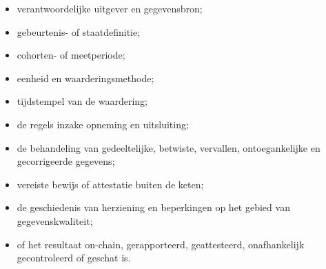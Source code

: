 \documentclass[11pt]{article}
\begin{document}
\begin{itemize}[leftmargin=*]
\item verantwoordelijke uitgever en gegevensbron;
\item gebeurtenis- of staatdefinitie;
\item cohorten- of meetperiode;
\item eenheid en waarderingsmethode;
\item tijdstempel van de waardering;
\item de regels inzake opneming en uitsluiting;
\item de behandeling van gedeeltelijke, betwiste, vervallen, ontoegankelijke en gecorrigeerde gegevens;
\item vereiste bewijs of attestatie buiten de keten;
\item de geschiedenis van herziening en beperkingen op het gebied van gegevenskwaliteit;
\item of het resultaat on-chain, gerapporteerd, geattesteerd, onafhankelijk gecontroleerd of geschat is.
\end{itemize}
\end{document}
